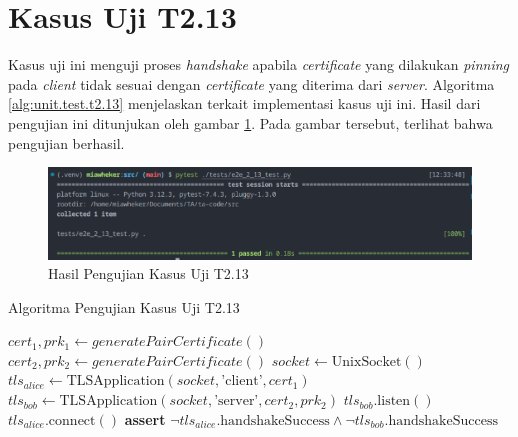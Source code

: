 \section{Kasus Uji T2.13}

Kasus uji ini menguji proses \emph{handshake} apabila \emph{certificate} yang dilakukan \emph{pinning} pada \emph{client} tidak sesuai dengan \emph{certificate} yang diterima dari \emph{server}. Algoritma \ref{alg:unit.test.t2.13} menjelaskan terkait implementasi kasus uji ini. Hasil dari pengujian ini ditunjukan oleh gambar \ref{fig:unit.test.t2.13}. Pada gambar tersebut, terlihat bahwa pengujian berhasil.

\begin{figure}[ht]
  \centering
  \includegraphics[width=\textwidth]{chapters/res/appendix-4/2.13.png}
  \caption{Hasil Pengujian Kasus Uji T2.13}
  \label{fig:unit.test.t2.13}
\end{figure}


\begin{algorithm}
  \caption{Algoritma Pengujian Kasus Uji T2.13}
  \label{alg:unit.test.t2.13}
  \begin{algorithmic}
    \State $cert_1, prk_1 \gets generatePairCertificate()$
    \State $cert_2, prk_2 \gets generatePairCertificate()$
    \State $socket \gets \text{UnixSocket}()$
    \State $tls_{alice} \gets \text{TLSApplication}(socket, \text{'client'}, cert_1)$ 
    \State $tls_{bob} \gets \text{TLSApplication}(socket, \text{'server'}, cert_2, prk_2)$
    \State
    \State $tls_{bob}.\text{listen}()$  
    \State $tls_{alice}.\text{connect}()$  
    \State
    \State
    \State \textbf{assert} $\lnot tls_{alice}.\text{handshakeSuccess} \land \lnot tls_{bob}.\text{handshakeSuccess}$
  \end{algorithmic}
\end{algorithm}
